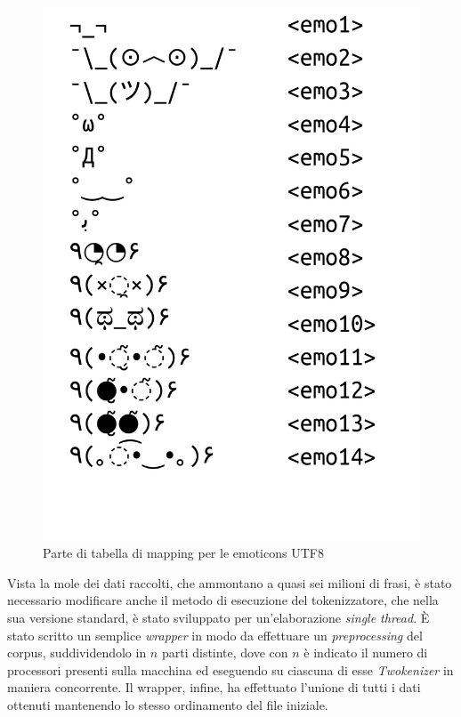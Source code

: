 \documentclass[a4paper,12pt,openright,twoside]{report}
\theoremstyle{definition}
\begin{document}
\begin{figure}[H]
	\centering
	\includegraphics[scale=0.3]{Immagini/emoticonsTable.pdf}
	\caption{Parte di tabella di mapping per le emoticons UTF8}
	\label{fig:mappingEmo}
\end{figure}

Vista la mole dei dati raccolti, che ammontano a quasi sei milioni di frasi, è stato necessario modificare anche il metodo di esecuzione del tokenizzatore, 
che nella sua versione standard, è stato sviluppato per un'elaborazione \emph{single thread}.
\`E stato scritto un semplice \emph{wrapper} in modo da effettuare un \emph{preprocessing} del corpus, 
suddividendolo in $n$ parti distinte, dove con $n$ è indicato il numero di processori presenti 
sulla macchina ed
eseguendo su ciascuna di esse \emph{Twokenizer} in maniera concorrente.
Il wrapper, infine, ha effettuato l'unione di tutti i dati ottenuti mantenendo lo stesso 
ordinamento del file iniziale.
\end{document}
